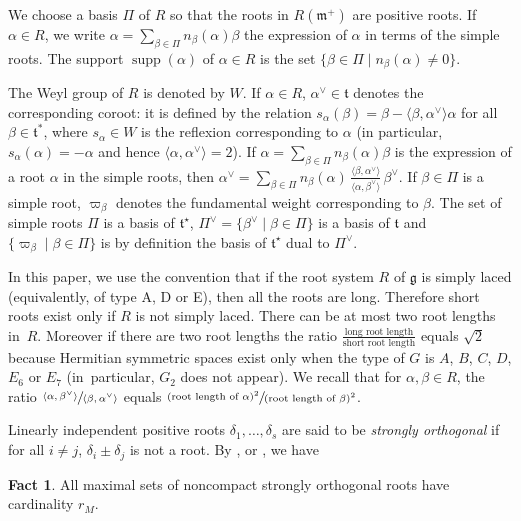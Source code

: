 \documentclass[10pt]{amsart}
\let\oldvee\vee
\renewcommand{\vee}{{\scriptscriptstyle\oldvee}}
\newcommand{\citestar}[3]{\cite[#3]{#1}}
\theoremstyle{plain}
\theoremstyle{definition}
\newtheorem{fact}[theo]{Fact}
\DeclareMathOperator{\supp}{supp}
\newcommand{\fgg}{\mathfrak{g}}
\newcommand{\fm}{\mathfrak{m}}
\newcommand{\ft}{\mathfrak{t}}
\newcommand{\rkm}{{r_M}}
\newcommand{\scal}[1]{\langle #1 \rangle}
\begin{document}
We choose a basis $\Pi$ of $R$ so that the roots in $R(\fm^+)$ are positive roots. If $\alpha\in R$, we
write $\alpha=\sum_{\beta\in\Pi}n_\beta(\alpha)\beta$ the expression of $\alpha$ in terms of the simple roots. The
support $\supp(\alpha)$ of $\alpha\in R$ is the set $\{\beta\in\Pi\mid n_\beta(\alpha)\neq 0\}$.

The Weyl group of $R$ is denoted by $W$. If $\alpha\in R$, $\alpha^\vee\in\ft$ denotes the corresponding
coroot: it is defined by the relation $s_\alpha(\beta)=\beta-\scal{\beta,\alpha^\vee}\alpha$ for all $\beta\in \ft^*$, where
$s_\alpha\in W$ is the reflexion corresponding to $\alpha$ (in particular, $s_\alpha(\alpha)=-\alpha$ and hence
$\scal{\alpha,\alpha^\vee}=2$). If $\alpha=\sum_{\beta\in\Pi}n_\beta(\alpha)\beta$ is the
expression of a root $\alpha$ in the simple roots, then $\alpha^\vee= \sum_{\beta\in\Pi}n_\beta(\alpha)\,
\frac{\scal{\beta,\alpha^\vee}}{\scal{\alpha,\beta^\vee}}\,\beta^\vee$.
If $\beta\in\Pi$ is a simple root, $\varpi_\beta$ denotes the
fundamental weight corresponding to $\beta$.
The set of simple roots $\Pi$ is a basis of $\ft^\star$,
$\Pi^\vee=\{\beta^\vee\mid\beta\in\Pi\}$ is a basis of $\ft$ and $\{\varpi_\beta\mid \beta\in\Pi\}$ is by
definition the basis of $\ft^\star$ dual to $\Pi^\vee$.

In this paper, we use the convention that if the root system $R$ of $\fgg$ is simply laced (equivalently,
of type A, D or E), then all
the roots are long. Therefore short roots exist only if $R$ is not simply laced. There can be at most
two root lengths in~$R$. Moreover if there are two root lengths the ratio
$\frac{\text{long
root length}}{\text{short root length}}$ equals $\sqrt{2}$ because Hermitian symmetric spaces exist
only when the type of $G$ is $A$, $B$, $C$, $D$, $E_6$ or $E_7$
(in~particular, $G_2$ does not appear). We recall that for $\alpha,\beta\in R$, the ratio
$\sfrac{\scal{\alpha,\beta^\vee}}{\scal{\beta,\alpha^\vee}}$ equals
$\sfrac{(\text{root length of }\alpha)^2}{(\text{root length of }\beta)^2}$.

Linearly independent positive
roots $\delta_1,\ldots, \delta_s$ are said to be \emph{strongly orthogonal} if for
all $i\neq j$, $\delta_i\pm \delta_j$ is not a root. By \cite{Harish}, or
\citestar{Helgason}*{Ch.\,VIII, }, we have

\begin{fact}\label{fact:maxstrong}
All maximal sets of noncompact strongly orthogonal roots have cardinality $\rkm$.
\end{fact}
\end{document}
